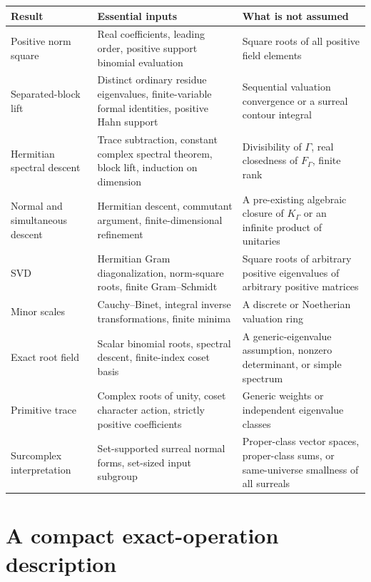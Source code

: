 \documentclass[11pt,letterpaper]{article}
\numberwithin{equation}{section}
\theoremstyle{definition}
\theoremstyle{remark}
\begin{document}
\begin{longtable}{@{}L{0.25\textwidth}L{0.35\textwidth}L{0.34\textwidth}@{}}
\toprule
Result & Essential inputs & What is not assumed \\
\midrule\endhead
Positive norm square & Real coefficients, leading order, positive support binomial evaluation & Square roots of all positive field elements \\
\addlinespace
Separated-block lift & Distinct ordinary residue eigenvalues, finite-variable formal identities, positive Hahn support & Sequential valuation convergence or a surreal contour integral \\
\addlinespace
Hermitian spectral descent & Trace subtraction, constant complex spectral theorem, block lift, induction on dimension & Divisibility of $\Gamma$, real closedness of $F_\Gamma$, finite rank \\
\addlinespace
Normal and simultaneous descent & Hermitian descent, commutant argument, finite-dimensional refinement & A pre-existing algebraic closure of $K_\Gamma$ or an infinite product of unitaries \\
\addlinespace
SVD & Hermitian Gram diagonalization, norm-square roots, finite Gram--Schmidt & Square roots of arbitrary positive eigenvalues of arbitrary positive matrices \\
\addlinespace
Minor scales & Cauchy--Binet, integral inverse transformations, finite minima & A discrete or Noetherian valuation ring \\
\addlinespace
Exact root field & Scalar binomial roots, spectral descent, finite-index coset basis & A generic-eigenvalue assumption, nonzero determinant, or simple spectrum \\
\addlinespace
Primitive trace & Complex roots of unity, coset character action, strictly positive coefficients & Generic weights or independent eigenvalue classes \\
\addlinespace
Surcomplex interpretation & Set-supported surreal normal forms, set-sized input subgroup & Proper-class vector spaces, proper-class sums, or same-universe smallness of all surreals \\
\bottomrule
\end{longtable}

\clearpage
\section{A compact exact-operation description}
\label{app:algorithm}
\end{document}
